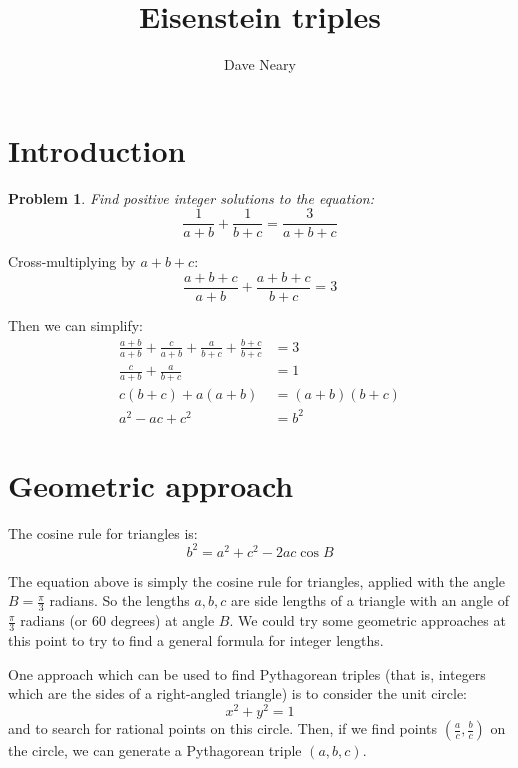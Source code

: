 \documentclass{article}
\newtheorem*{problem}{Problem}
\begin{document}
\title{Eisenstein triples}
\author{Dave Neary}

\maketitle

\section{Introduction}

\begin{problem}
	Find positive integer solutions to the equation:
	\[ \frac{1}{a+b} + \frac{1}{b+c} = \frac{3}{a+b+c} \]
\end{problem}

Cross-multiplying by $a+b+c$:
\[ \frac{a+b+c}{a+b} + \frac{a+b+c}{b+c} = 3 \]

Then we can simplify:
\begin{align*}
	\frac{a+b}{a+b} + \frac{c}{a+b} + \frac{a}{b+c} + \frac{b+c}{b+c} &= 3 \\
	\frac{c}{a+b} + \frac{a}{b+c} &= 1 \\
	c(b+c) + a(a+b) &= (a+b)(b+c) \\
	a^2 -ac +c^2 &= b^2
\end{align*}

\section{Geometric approach}

The cosine rule for triangles is:
\[ b^2 = a^2 + c^2 - 2ac \cos B \]

The equation above is simply the cosine rule for triangles, applied with the angle 
$B = \frac{\pi}{3}$ radians. So the lengths $a, b, c$ are side lengths of a triangle with 
an angle of $\frac{\pi}{3}$ radians (or 60 degrees) at angle $B$. We could try some 
geometric approaches at this point to try to find a general formula for integer lengths.

One approach which can be used to find Pythagorean triples (that is, integers which are 
the sides of a right-angled triangle) is to consider the unit circle:
\[ x^2 + y^2 = 1 \]
and to search for rational points on this circle. Then, if we find points
$(\frac{a}{c},\frac{b}{c})$ on the circle, we can generate a Pythagorean triple $(a,b,c)$.
\end{document}
